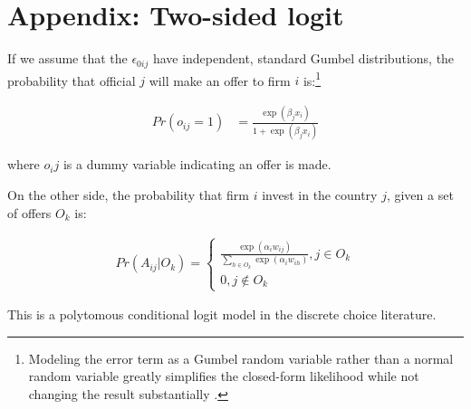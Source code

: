 \section{Appendix: Two-sided logit}

If we assume that the $\epsilon_{0ij}$ have independent, standard Gumbel distributions, the probability that official $j$ will make an offer to firm $i$ is:\footnote{Modeling the error term as a Gumbel random variable rather than a normal random variable greatly simplifies the closed-form likelihood while not changing the result substantially \citep{Maddala1986}.}

\begin{align}
Pr(o_{ij} = 1) &= \frac{\exp(\beta_j x_i)}{1 + \exp(\beta_j x_i)}
\end{align}

where $o_ij$ is a dummy variable indicating an offer is made.

On the other side, the probability that firm $i$ invest in the country $j$, given a set of offers $O_k$ is:

\begin{align}
Pr(A_{ij} | O_k) =\begin{cases}
\frac{\exp(\alpha_i w_{ij})}{\displaystyle \sum_{h \in O_k} \exp(\alpha_i w_{ih})}, j \in O_k\\
0, j \notin O_k
\end{cases}
\end{align}

This is a polytomous conditional logit model in the discrete choice literature.